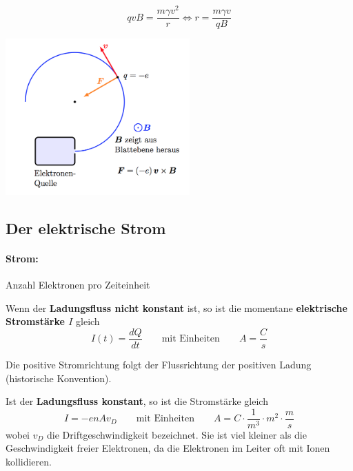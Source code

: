\documentclass[11pt]{article}
\begin{document}
\begin{minipage}{.5\textwidth}
    \begin{equation*}
    qvB = \frac{m\gamma v^2}{r} \Leftrightarrow r = \frac{m\gamma v}{qB}
    \end{equation*}
\end{minipage}%
\begin{minipage}{.5\textwidth}
  	\centering
    \includegraphics[width=200pt]{images/mf/zentripetalkraft}
\end{minipage}

\subsection{Der elektrische Strom}

\paragraph{Strom:} Anzahl Elektronen pro Zeiteinheit

Wenn der \textbf{Ladungsfluss nicht konstant} ist, so ist die momentane \textbf{elektrische Stromst{\"a}rke $I$} gleich
\begin{equation*}
	I(t) = \frac{dQ}{dt} \qquad\text{mit Einheiten}\qquad A = \frac{C}{s}
\end{equation*}

Die positive Stromrichtung folgt der Flussrichtung der positiven Ladung (historische Konvention).

Ist der \textbf{Ladungsfluss konstant}, so ist die Stromst{\"a}rke gleich
\begin{equation*}
	I = -enAv_D \qquad\text{mit Einheiten}\qquad A = C\cdot\frac{1}{m^3}\cdot m^2\cdot\frac{m}{s}
\end{equation*}
wobei $v_D$ die Driftgeschwindigkeit bezeichnet. Sie ist viel kleiner als die Geschwindigkeit freier Elektronen, da die Elektronen im Leiter oft mit Ionen kollidieren.
\end{document}
